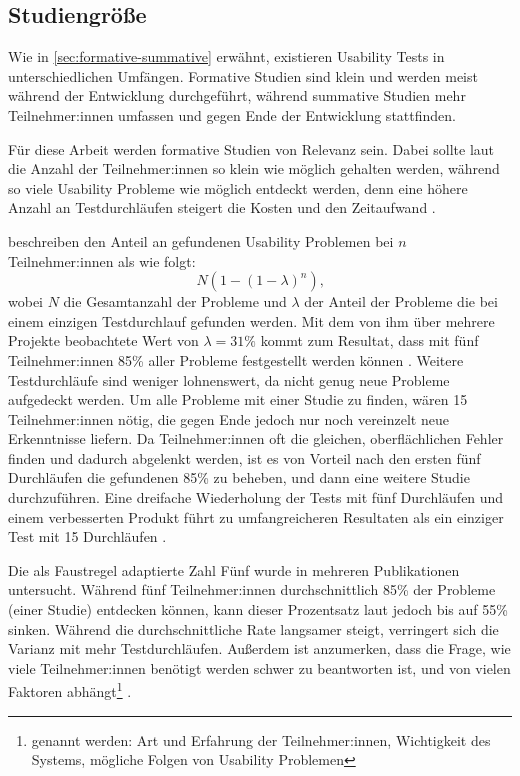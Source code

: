 \subsection{Studiengröße}
\label{sec:study-size}

Wie in \ref{sec:formative-summative} erwähnt, existieren Usability Tests in unterschiedlichen Umfängen. Formative Studien sind klein und werden meist während der Entwicklung durchgeführt, während summative Studien mehr Teilnehmer:innen umfassen und gegen Ende der Entwicklung stattfinden.

Für diese Arbeit werden formative Studien von Relevanz sein. Dabei sollte laut \textcite{nielsenWhyYou2000} die Anzahl der Teilnehmer:innen so klein wie möglich gehalten werden, während so viele Usability Probleme wie möglich entdeckt werden, denn eine höhere Anzahl an Testdurchläufen steigert die Kosten und den Zeitaufwand \parencites{faulknerFiveuserAssumption2003}.

\textcite{nielsenMathematicalModel1993} beschreiben den Anteil an gefundenen Usability Problemen bei
$n$ Teilnehmer:innen als wie folgt:
\begin{equation}
  \label{equ:finding-usability-problems}
  N(1-(1-\lambda{})^n)\text{,}
\end{equation}
wobei $N$ die Gesamtanzahl der Probleme und $\lambda{}$ der Anteil der Probleme die bei einem einzigen Testdurchlauf gefunden werden. Mit dem von ihm über mehrere Projekte beobachtete Wert von $\lambda{}=31\%$ kommt \citeauthor{nielsenWhyYou2000} zum Resultat, dass mit fünf Teilnehmer:innen 85\% aller Probleme festgestellt werden können \parencite{nielsenWhyYou2000}. Weitere Testdurchläufe sind weniger lohnenswert, da nicht genug neue Probleme aufgedeckt werden. Um alle Probleme mit einer Studie zu finden, wären 15 Teilnehmer:innen nötig, die gegen Ende jedoch nur noch vereinzelt neue Erkenntnisse liefern. Da Teilnehmer:innen oft die gleichen, oberflächlichen Fehler finden und dadurch abgelenkt werden, ist es von Vorteil nach den ersten fünf Durchläufen die gefundenen 85\% zu beheben, und dann eine weitere Studie durchzuführen. Eine dreifache Wiederholung der Tests mit fünf Durchläufen und einem verbesserten Produkt führt zu umfangreicheren Resultaten als ein einziger Test mit 15 Durchläufen \parencite{nielsenWhyYou2000}.

Die als Faustregel adaptierte Zahl Fünf wurde in mehreren Publikationen untersucht. Während fünf Teilnehmer:innen durchschnittlich 85\% der Probleme (einer Studie) entdecken können, kann dieser Prozentsatz laut \textcite{faulknerFiveuserAssumption2003} jedoch bis auf 55\% sinken. Während die durchschnittliche Rate langsamer steigt, verringert sich die Varianz mit mehr Testdurchläufen. Außerdem ist anzumerken, dass die Frage, wie viele Teilnehmer:innen benötigt werden schwer zu beantworten ist, und von vielen Faktoren abhängt\footnote{genannt werden: Art und Erfahrung der Teilnehmer:innen, Wichtigkeit des Systems, mögliche Folgen von Usability Problemen} \parencite{faulknerFiveuserAssumption2003}.


